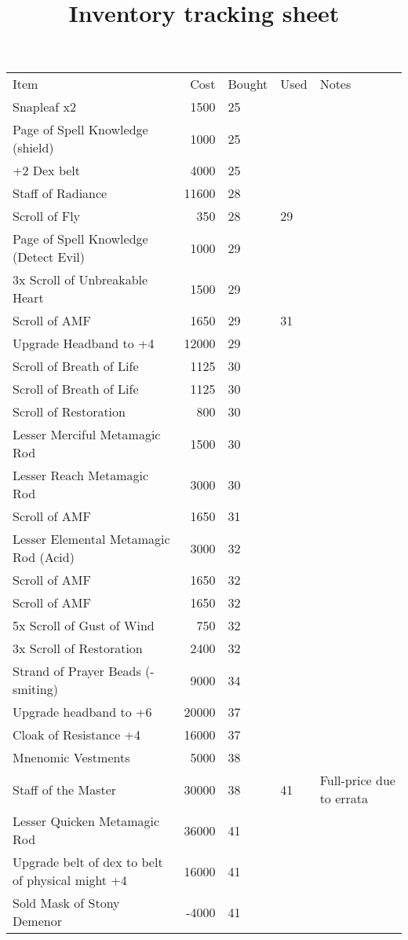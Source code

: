 \documentclass[a4paper,10pt]{memoir}
\title{Inventory tracking sheet}
\begin{document}
\begin{tabular}{l r l l l}
Item                             &  Cost 	& Bought & Used & Notes \\
Snapleaf x2                      &  1500	& 25     &      &       \\
Page of Spell Knowledge (shield) &  1000	& 25     &      &       \\
+2 Dex belt			 &  4000	& 25     &      & \\
Staff of Radiance		 & 11600	& 28	 &	& \\
Scroll of Fly			 &   350	& 28	 & 29   & \\
Page of Spell Knowledge (Detect Evil) & 1000	& 29	 &	& \\
3x Scroll of Unbreakable Heart	 &   1500	& 29	 &	& \\
Scroll of AMF			 &   1650	& 29	 & 31	& \\
Upgrade Headband to +4		 &  12000	& 29	 &	& \\
Scroll of Breath of Life	 &   1125	& 30	 &	& \\
Scroll of Breath of Life	 &   1125	& 30	 &	& \\
Scroll of Restoration		 &    800	& 30	 &	& \\
Lesser Merciful Metamagic Rod    &   1500	& 30	 &	& \\
Lesser Reach Metamagic Rod	 &   3000	& 30	 & 	& \\
Scroll of AMF			 &   1650	& 31	 &	& \\
Lesser Elemental Metamagic Rod (Acid) & 3000	& 32	 &	& \\
Scroll of AMF			 &   1650	& 32	 &	& \\
Scroll of AMF			 &   1650	& 32	 &	& \\
5x Scroll of Gust of Wind	 &    750	& 32	 &	& \\
3x Scroll of Restoration	 &   2400	& 32	 &	& \\
Strand of Prayer Beads (-smiting)&   9000	& 34	 &	& \\
Upgrade headband to +6		 &  20000	& 37	 &	& \\
Cloak of Resistance +4		 &  16000	& 37	 &	& \\
Mnenomic Vestments		 &   5000	& 38	 &	& \\
Staff of the Master		 &  30000	& 38	 & 41   & Full-price due to errata \\
Lesser Quicken Metamagic Rod     &  36000	& 41	 &      & \\
Upgrade belt of dex to belt of physical might +4                                 
                                 &  16000       & 41     &      & \\
Sold Mask of Stony Demenor       &  -4000       & 41     &      & \\


\end{tabular}
\end{document}
